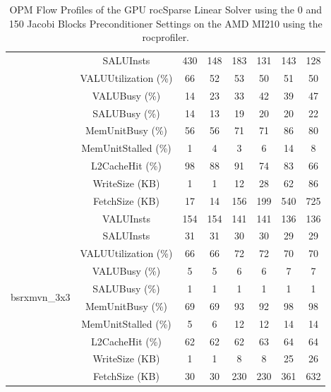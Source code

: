 \begin{table}[!h]
\begin{tabular}{c|c|c|c|c|c|c|c}
& SALUInsts   & 430 & 148 & 183 & 131 & 143 & 128\\
& VALUUtilization (\%)  & 66 & 52 & 53 & 50 & 51 & 50\\
& VALUBusy (\%)          & 14 & 23 & 33 & 42 & 39 & 47\\
& SALUBusy (\%)          & 14 & 13 & 19 & 20 & 20 & 22\\
& MemUnitBusy (\%)        & 56 & 56 & 71 & 71 & 86 & 80\\
& MemUnitStalled (\%)      & 1 & 4 & 3 & 6 & 14 & 8\\
& L2CacheHit (\%)  & 98 & 88 & 91 & 74 & 83 & 66\\
& WriteSize (KB)  & 1 & 1 & 12 & 28 & 62 & 86\\
& FetchSize (KB)  & 17 & 14 & 156 & 199 &  540 & 725\\\hline
\multirow{10}{*}{bsrxmvn\_3x3} & VALUInsts & 154 & 154 & 141 & 141 & 136 & 136\\
& SALUInsts   & 31 & 31 & 30 & 30 & 29 & 29\\
& VALUUtilization (\%)  & 66 & 66 & 72 & 72 & 70 & 70\\
& VALUBusy (\%)          & 5 & 5 & 6 & 6 & 7 & 7\\
& SALUBusy (\%)          & 1 & 1 & 1 & 1 & 1 & 1\\
& MemUnitBusy (\%)        & 69 & 69 & 93 & 92 & 98 & 98\\
& MemUnitStalled (\%)      & 5 & 6 & 12 & 12 & 14 & 14\\
& L2CacheHit (\%)  & 62 & 62 & 62 & 63 & 64 & 64\\
& WriteSize (KB)  & 1 & 1 & 8 & 8 & 25 & 26\\
& FetchSize (KB)  & 30 & 30 & 230 & 230 & 361 & 632\\\hline
\end{tabular}
\caption{OPM Flow Profiles of the GPU rocSparse Linear Solver using the 0 and 150 Jacobi Blocks Preconditioner Settings on the AMD MI210 using the rocprofiler.}
\label{tab:rocprofiler}
\end{table}